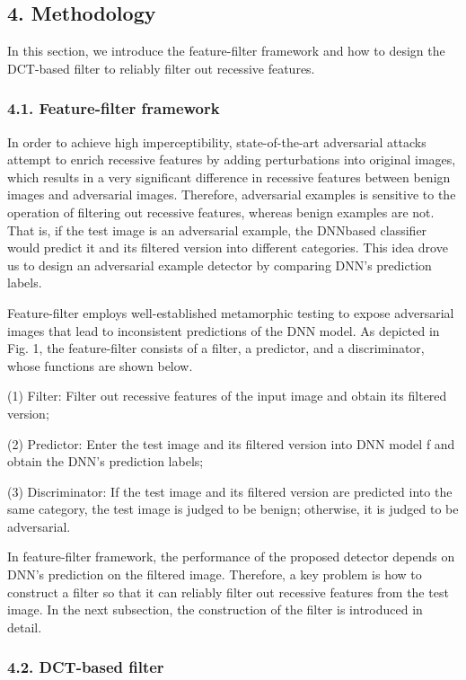 \documentclass{article}
\begin{document}
\subsection{4. Methodology}

In this section, we introduce the feature-filter framework and how to design the DCT-based filter to reliably filter out recessive features.

\subsubsection{4.1. Feature-filter framework}

In order to achieve high imperceptibility, state-of-the-art adversarial attacks attempt to enrich recessive features by adding perturbations into original images, which results in a very significant difference in recessive features between benign images and adversarial images. Therefore, adversarial examples is sensitive to the operation of filtering out recessive features, whereas benign examples are not. That is, if the test image is an adversarial example, the DNNbased classifier would predict it and its filtered version into different categories. This idea drove us to design an adversarial example detector by comparing DNN's prediction labels.

Feature-filter employs well-established metamorphic testing to expose adversarial images that lead to inconsistent predictions of the DNN model. As depicted in Fig. 1, the feature-filter consists of a filter, a predictor, and a discriminator, whose functions are shown below.

(1) Filter: Filter out recessive features of the input image and obtain its filtered version;

(2) Predictor: Enter the test image and its filtered version into DNN model f and obtain the DNN's prediction labels;

(3) Discriminator: If the test image and its filtered version are predicted into the same category, the test image is judged to be benign; otherwise, it is judged to be adversarial.

In feature-filter framework, the performance of the proposed detector depends on DNN's prediction on the filtered image. Therefore, a key problem is how to construct a filter so that it can reliably filter out recessive features from the test image. In the next subsection, the construction of the filter is introduced in detail.

\subsubsection{4.2. DCT-based filter}
\end{document}
